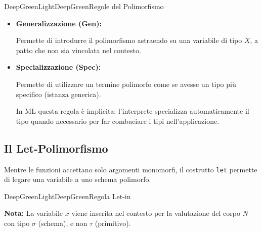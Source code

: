 \documentclass[a4paper,11pt]{report}
\begin{document}
\begin{cdefframe}{DeepGreenLight}{DeepGreen}{Regole del Polimorfismo}{}
    \begin{itemize}
        \item \textbf{Generalizzazione (Gen):}
        
            Permette di introdurre il polimorfismo astraendo su una variabile di tipo $X$, a patto che non sia vincolata nel contesto.
        \begin{prooftree}
        \end{prooftree}

        \item \textbf{Specializzazione (Spec):}
        
            Permette di utilizzare un termine polimorfo come se avesse un tipo più specifico (istanza generica).

        \begin{prooftree}
        \end{prooftree}
        {\color{gray}In ML questa regola è implicita: l'interprete specializza automaticamente il tipo quando necessario per far combaciare i tipi nell'applicazione.}
    \end{itemize}
\end{cdefframe}

\subsection{Il Let-Polimorfismo}
Mentre le funzioni accettano solo argomenti monomorfi, il costrutto \texttt{let} permette di legare una variabile a uno schema polimorfo.

\begin{cdefframe}{DeepGreenLight}{DeepGreen}{Regola Let-in}{}
    \begin{prooftree}
    \end{prooftree}
    \textbf{Nota:} La variabile $x$ viene inserita nel contesto per la valutazione del corpo $N$ con tipo $\sigma$ (schema), e non $\tau$ (primitivo).
\end{cdefframe}
\end{document}
